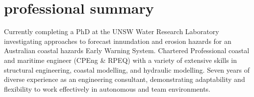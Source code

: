 \section{professional summary}
\begin{adjustwidth}{2cm}{}
	Currently completing a PhD at the UNSW Water Research Laboratory investigating approaches to forecast innundation and erosion hazards for an Australian coastal hazards Early Warning System.
 	Chartered Professional coastal and maritime engineer (CPEng \& RPEQ) with a variety of extensive skills in structural engineering, coastal modelling, and hydraulic modelling.
  	Seven years of diverse experience as an engineering consultant, demonstrating adaptability and flexibility to work effectively in autonomous and team environments.\\
  \vspace{-2\parskip}
\end{adjustwidth}
